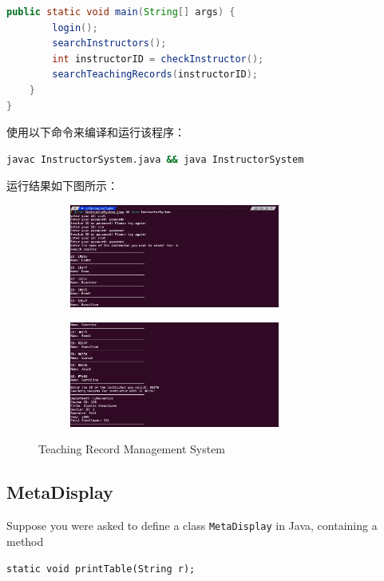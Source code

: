 \documentclass{article}
\renewcommand\tt{\texttt}
\begin{document}
\begin{lstlisting}[language=java]
    public static void main(String[] args) {
        login();
        searchInstructors();
        int instructorID = checkInstructor();
        searchTeachingRecords(instructorID);
    }
}
\end{lstlisting}

使用以下命令来编译和运行该程序：

\begin{lstlisting}[language=bash]
javac InstructorSystem.java && java InstructorSystem
\end{lstlisting}

运行结果如下图所示：


\begin{figure}[htbp]
  \centering
  \begin{subfigure}
    \centering
    \includegraphics[width=0.76\textwidth]{img/12.png}
  \end{subfigure}
  \hfill
  \begin{subfigure}
    \centering
    \includegraphics[width=0.76\textwidth]{img/13.png}
  \end{subfigure}
  \caption{Teaching Record Management System}
\end{figure}

\subsection{MetaDisplay}

Suppose you were asked to define a class \tt{MetaDisplay} in Java, containing a method
\begin{center}
  \tt{static void printTable(String r);}
\end{center}
\end{document}
